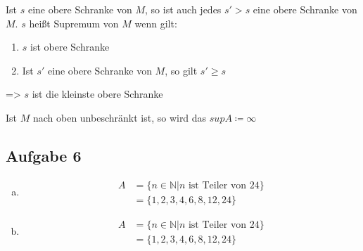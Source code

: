 \documentclass{article}
\begin{document}
Ist $s$ eine obere Schranke von $M$, so ist auch jedes $s' > s$ eine obere Schranke von $M$. $s$ heißt Supremum von
$M$ wenn gilt:
\begin{enumerate}
\item $s$ ist obere Schranke
\item Ist $s'$ eine obere Schranke von $M$, so gilt $s' \geq s$
\end{enumerate}

=> $s$ ist die kleinste obere Schranke

Ist $M$ nach oben unbeschränkt ist, so wird das  $sup A \coloneq \infty$

\subsection*{Aufgabe 6}
\begin{enumerate}[(a)]
\item
  \begin{align*}
    A &= \{ n \in \mathbb{N} | n \text{ ist Teiler von } 24\} \\
      &= \{ 1,2,3,4,6,8,12,24 \}
  \end{align*}
\item
\begin{align*}
    A &= \{ n \in \mathbb{N} | n \text{ ist Teiler von } 24\} \\
      &= \{ 1,2,3,4,6,8,12,24 \}
  \end{align*}  
\end{enumerate}
\end{document}
